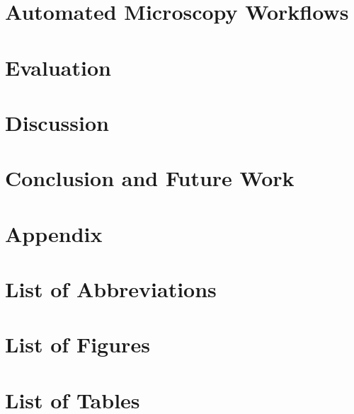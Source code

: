 \documentclass{article}
\begin{document}
\newpage
\section{Automated Microscopy Workflows}\label{sec:workflows}


\newpage
\section{Evaluation}\label{sec:evaluation}


\newpage
\section{Discussion}


\newpage
\section{Conclusion and Future Work}


\newpage
\appendix
\section{Appendix}


\newpage
{}
{}
\glsaddall
\printglossary[title={Glossary}, toctitle={Glossary}, nonumberlist]

\newpage
\section*{List of Abbreviations}


\newpage
\section*{List of Figures}
\renewcommand{\listfigurename}{}  %
\listoffigures

\newpage
\section*{List of Tables}
\renewcommand{\listtablename}{}   %
\listoftables
\end{document}
